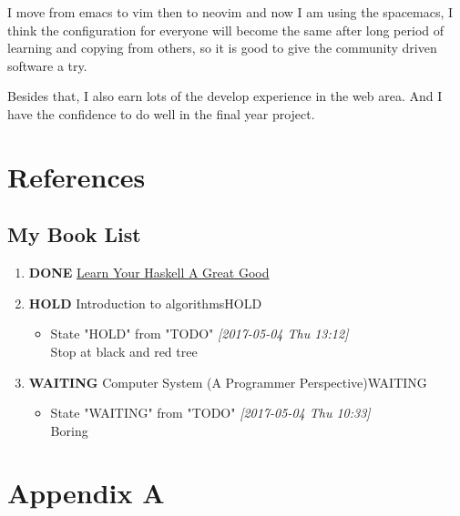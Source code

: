 \documentclass[12pt]{scrartcl}
\begin{document}
I move from emacs to vim then to neovim and now I am using the spacemacs, I think the configuration for everyone will become the same after long period of learning and copying from others, so it is good to give the community driven software a try.

Besides that, I also earn lots of the develop experience in the web area. And I
have the confidence to do well in the final year project.

\newpage
\section{References}
\label{sec:orgc5423b9}
\subsection{My Book List}
\label{sec:org18f4aa9}
\begin{enumerate}
\item {\bfseries\sffamily DONE} \href{http://learnyouahaskell.com/chapters}{Learn Your Haskell A Great Good }
\label{sec:org0f15ba0}

\item {\bfseries\sffamily HOLD} Introduction to algorithms\hfill{}\textsc{HOLD}
\label{sec:org1ab4282}
\begin{itemize}
\item State "HOLD"       from "TODO"       \textit{[2017-05-04 Thu 13:12] } \\
Stop at black and red tree
\end{itemize}
\item {\bfseries\sffamily WAITING} Computer System (A Programmer Perspective)\hfill{}\textsc{WAITING}
\label{sec:org4606690}
\begin{itemize}
\item State "WAITING"    from "TODO"       \textit{[2017-05-04 Thu 10:33] } \\
Boring
\end{itemize}
\newpage
\end{enumerate}
\section{Appendix A}
\label{sec:org91b4523}
\end{document}
